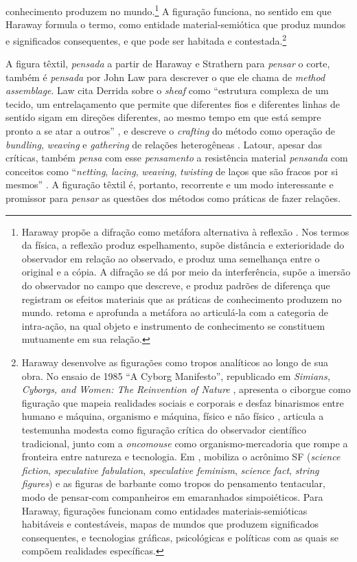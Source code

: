conhecimento produzem no mundo.\footnote{Haraway propõe a difração como metáfora alternativa à reflexão \parencite{Haraway1997Modest}. Nos termos da física, a reflexão produz espelhamento, supõe distância e exterioridade do observador em relação ao observado, e produz uma semelhança entre o original e a cópia. A difração se dá por meio da interferência, supõe a imersão do observador no campo que descreve, e produz padrões de diferença que registram os efeitos materiais que as práticas de conhecimento produzem no mundo. \textcite{Barad2007Meeting} retoma e aprofunda a metáfora ao articulá-la com a categoria de intra-ação, na qual objeto e instrumento de conhecimento se constituem mutuamente em sua relação.} A figuração funciona, no sentido em que Haraway formula o termo, como entidade material-semiótica que produz mundos e significados consequentes, e que pode ser habitada e contestada.\footnote{Haraway desenvolve as figurações como tropos analíticos ao longo de sua obra. No ensaio de 1985 \enquote{A Cyborg Manifesto}, republicado em \textit{Simians, Cyborgs, and Women: The Reinvention of Nature} \parencite{Haraway1991Situated}, apresenta o ciborgue como figuração que mapeia realidades sociais e corporais e desfaz binarismos entre humano e máquina, organismo e máquina, físico e não físico \parencite{Haraway1997Modest}, articula a testemunha modesta como figuração crítica do observador científico tradicional, junto com a \textit{oncomouse} como organismo-mercadoria que rompe a fronteira entre natureza e tecnologia. Em \textcite{Haraway2023Ficar}, mobiliza o acrônimo SF (\textit{science fiction}, \textit{speculative fabulation}, \textit{speculative feminism}, \textit{science fact}, \textit{string figures}) e as figuras de barbante como tropos do pensamento tentacular, modo de pensar-com companheiros em emaranhados simpoiéticos. Para Haraway, figurações funcionam como entidades materiais-semióticas habitáveis e contestáveis, mapas de mundos que produzem significados consequentes, e tecnologias gráficas, psicológicas e políticas com as quais se compõem realidades específicas.}

A figura têxtil, \textit{pensada} a partir de Haraway e Strathern para \textit{pensar} o corte, também é \textit{pensada} por John Law \parencite{Law2004After} para descrever o que ele chama de \textit{method assemblage}. Law cita Derrida sobre o \textit{sheaf} como \enquote{estrutura complexa de um tecido, um entrelaçamento que permite que diferentes fios e diferentes linhas de sentido sigam em direções diferentes, ao mesmo tempo em que está sempre pronto a se atar a outros} \parencite[p.~41]{Law2004After}, e descreve o \textit{crafting} do método como operação de \textit{bundling}, \textit{weaving} e \textit{gathering} de relações heterogêneas \parencite[pp.~41--42, 144]{Law2004After}. Latour, apesar das críticas, também \textit{pensa} com esse \textit{pensamento} a resistência material \textit{pensanda} com conceitos como \enquote{\textit{netting}, \textit{lacing}, \textit{weaving}, \textit{twisting} de laços que são fracos por si mesmos} \parencite[p.~3]{latour1996clarifications}. A figuração têxtil é, portanto, recorrente e um modo interessante e promissor para \textit{pensar} as questões dos métodos como práticas de fazer relações.

